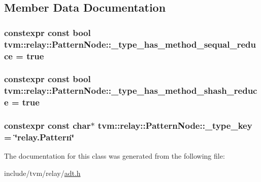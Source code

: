 \subsection{Member Data Documentation}
\subsubsection[{\texorpdfstring{\+\_\+type\+\_\+has\+\_\+method\+\_\+sequal\+\_\+reduce}{_type_has_method_sequal_reduce}}]{\setlength{\rightskip}{0pt plus 5cm}constexpr const bool tvm\+::relay\+::\+Pattern\+Node\+::\+\_\+type\+\_\+has\+\_\+method\+\_\+sequal\+\_\+reduce = true\hspace{0.3cm}{\ttfamily [static]}}\hypertarget{classtvm_1_1relay_1_1PatternNode_ac52b4d661c8dd415bec83ec7d9dea6b5}{}\label{classtvm_1_1relay_1_1PatternNode_ac52b4d661c8dd415bec83ec7d9dea6b5}
\subsubsection[{\texorpdfstring{\+\_\+type\+\_\+has\+\_\+method\+\_\+shash\+\_\+reduce}{_type_has_method_shash_reduce}}]{\setlength{\rightskip}{0pt plus 5cm}constexpr const bool tvm\+::relay\+::\+Pattern\+Node\+::\+\_\+type\+\_\+has\+\_\+method\+\_\+shash\+\_\+reduce = true\hspace{0.3cm}{\ttfamily [static]}}\hypertarget{classtvm_1_1relay_1_1PatternNode_a3ae0b4252660bc9b6b68be14a5fadb4e}{}\label{classtvm_1_1relay_1_1PatternNode_a3ae0b4252660bc9b6b68be14a5fadb4e}
\subsubsection[{\texorpdfstring{\+\_\+type\+\_\+key}{_type_key}}]{\setlength{\rightskip}{0pt plus 5cm}constexpr const char$\ast$ tvm\+::relay\+::\+Pattern\+Node\+::\+\_\+type\+\_\+key = \char`\"{}relay.\+Pattern\char`\"{}\hspace{0.3cm}{\ttfamily [static]}}\hypertarget{classtvm_1_1relay_1_1PatternNode_ad34d63c3d67d63b42d392122610ab115}{}\label{classtvm_1_1relay_1_1PatternNode_ad34d63c3d67d63b42d392122610ab115}


The documentation for this class was generated from the following file\+:\begin{DoxyCompactItemize}
\item 
include/tvm/relay/\hyperlink{relay_2adt_8h}{adt.\+h}\end{DoxyCompactItemize}
